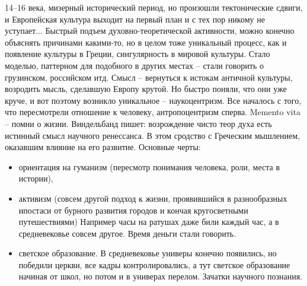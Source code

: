 \documentclass[a4paper, 12pt]{article}
\begin{document}
14--16 века, мизерный исторический период, но произошли тектонические 
сдвиги, и Европейская культура выходит на первый план и с тех пор никому 
не уступает... Быстрый подъем духовно-теоретической активности, можно 
конечно объяснять причинами какими-то, но в целом тоже уникальный 
процесс, как и появление культуры в Греции, сингулярность в мировой 
культуры. Стало моделью, паттерном для подобного в других местах -- 
стали говорить о грузинском, российском итд. Смысл -- вернуться 
к истокам античной культуры, возродить мысль, сделавшую Европу крутой. 
Но быстро поняли, что они уже круче, и вот поэтому возникло уникальное 
-- наукоцентризм. Все началось с того, что пересмотрели отношение 
к человеку, антропоцентризм сперва. Memento vita -- помни о жизни. 
Виндельбанд пишет: возрождение чисто теор духа есть истинный смысл 
научного ренессанса. В этом сродство с Греческим мышлением, оказавшим 
влияние на его развитие. Основные черты:
\begin{itemize}
  \item ориентация на гуманизм (пересмотр понимания человека, роли, 
    места в истории),
  \item активизм (совсем другой подход к жизни, проявившийся 
    в разнообразных ипостаси от бурного развития городов и кончая 
    кругосветными путешествиями) Например часы на ратушах даже били 
    каждый час, а в средневековье совсем другое. Время деньги стали 
    говорить.
  \item светское образование. В средневековье универы конечно появились, 
    но победили церкви, все кадры контролировались, а тут светское 
    образование начиная от школ, но потом и в универах перелом. Зачатки 
    научного познания.
\end{itemize}
\end{document}
